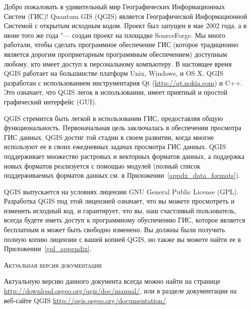 \mainmatter
\pagestyle{scrheadings}
\label{label_forward}



Добро пожаловать в удивительный мир Географических Информационных Систем
(ГИС)! Quantum GIS (QGIS) является Географической Информационной
Системой с открытым исходным кодом. Проект был запущен в мае 2002 года,
а в июне того же года "--- создан проект на площадке SourceForge. Мы
много работали, чтобы сделать программное обеспечение ГИС (которое
традиционно является дорогим проприетарным программным обеспечением)
доступным любому, кто имеет доступ к персональному компьютеру.
В настоящее время QGIS работает на большинстве платформ Unix, Windows, и
OS X. QGIS разработан с использованием инструментария Qt
(\url{http://qt.nokia.com}) и C++. Это означает, что QGIS легок в
использовании, имеет приятный и простой графический интерфейс (GUI).

QGIS стремится быть легкой в использовании ГИС, предоставляя общую
функциональность. Первоначальная цель заключалась в обеспечении
просмотра ГИС данных. QGIS достиг той стадии в своем развитии, когда
многие используют ее в своих ежедневных задачах просмотра ГИС данных.
QGIS поддерживает множество растровых и векторных форматов данных, а
поддержка новых форматов реализуется с помощью модулей (полный список
поддерживаемых форматов данных см. в Приложении~\ref{appdx_data_formats}).

QGIS выпускается на условиях лицензии GNU General Public License (GPL).
Разработка QGIS под этой лицензией означает, что вы можете просмотреть и
изменить исходный код, и гарантирует, что вы, наш счастливый
пользователь, всегда будете иметь доступ к программному обуспечению ГИС,
которое является бесплатным и может быть свободно изменено. Вы должны
были получить полную копию лицензии с вашей копией QGIS, но также вы
можете найти ее в Приложении~\ref{gpl_appendix}.

\begin{Tip}\caption{\textsc{Актуальная версия документации}}
Актуальную версию данного документа всегда можно найти на странице
\url{http://download.osgeo.org/qgis/doc/manual/}, или в разделе
документации на веб-сайте QGIS \url{http://qgis.osgeo.org/documentation/}
\end{Tip}

\label{label_majfeat}

